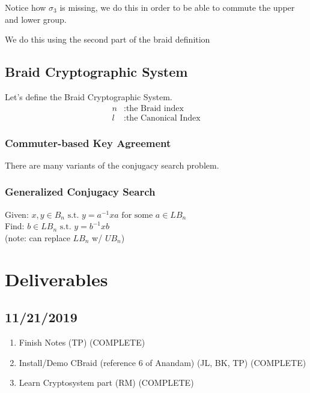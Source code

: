 \documentclass{article}
\begin{document}
	Notice how $\sigma_3$ is missing, we do this in order to be able to commute the upper and lower group.
	
	We do this using the second part of the braid definition
	
	\subsection{Braid Cryptographic System}
	Let's define the Braid Cryptographic System.
	\begin{align*}
	n &: \text{the Braid index} \\
	l &: \text{the Canonical Index}
	\end{align*}
	
	\subsubsection{Commuter-based Key Agreement}
	There are many variants of the conjugacy search problem.
	
	\subsubsection{Generalized Conjugacy Search}
	Given: $x,y \in B_n \text{ s.t. } y=a^{-1}xa \text{ for some } a \in LB_n$ \\
	Find: $b \in LB_n \text{ s.t. } y = b^{-1}xb$ \\
	(note: can replace $LB_n$ w/ $UB_n$)
	
	\section*{Deliverables}
	\subsection*{11/21/2019}
	\begin{enumerate}
		\item Finish Notes (TP) (COMPLETE)
		\item  Install/Demo CBraid (reference 6 of Anandam) (JL, BK, TP) (COMPLETE)
		\item Learn Cryptosystem part (RM) (COMPLETE)
	\end{enumerate}


	
\end{document}
